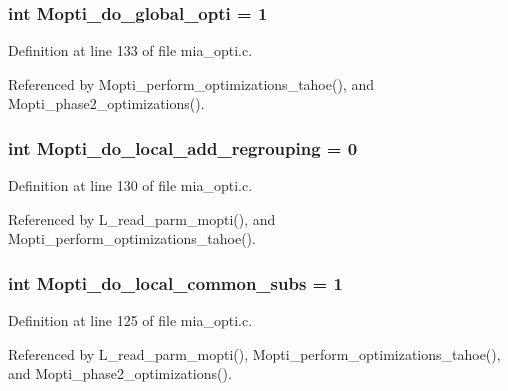 \subsubsection{\setlength{\rightskip}{0pt plus 5cm}int \bf{Mopti\_\-do\_\-global\_\-opti} = 1\hspace{0.3cm}{\tt  [static]}}\label{mia__opti_8c_f02ec830d5166dbd8655a1434360c610}




Definition at line 133 of file mia\_\-opti.c.

Referenced by Mopti\_\-perform\_\-optimizations\_\-tahoe(), and Mopti\_\-phase2\_\-optimizations().
\subsubsection{\setlength{\rightskip}{0pt plus 5cm}int \bf{Mopti\_\-do\_\-local\_\-add\_\-regrouping} = 0\hspace{0.3cm}{\tt  [static]}}\label{mia__opti_8c_728c5c38380b2b2061bb6c6a2ce8cce0}




Definition at line 130 of file mia\_\-opti.c.

Referenced by L\_\-read\_\-parm\_\-mopti(), and Mopti\_\-perform\_\-optimizations\_\-tahoe().
\subsubsection{\setlength{\rightskip}{0pt plus 5cm}int \bf{Mopti\_\-do\_\-local\_\-common\_\-subs} = 1\hspace{0.3cm}{\tt  [static]}}\label{mia__opti_8c_4234ca7ed3370ad04a9d1344b1dd986a}




Definition at line 125 of file mia\_\-opti.c.

Referenced by L\_\-read\_\-parm\_\-mopti(), Mopti\_\-perform\_\-optimizations\_\-tahoe(), and Mopti\_\-phase2\_\-optimizations().
